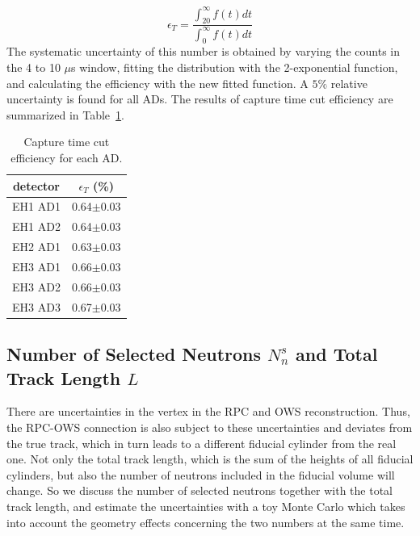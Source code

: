 \begin{equation}
	\epsilon_T=\frac{\int_{20}^{\infty}f(t)dt}{\int_{0}^{\infty}f(t)dt}
\end{equation}
The systematic uncertainty of this number is obtained by varying the counts in the 4 to 10 $\mu$s window, fitting the distribution with the 2-exponential function, and calculating the efficiency with the new fitted function. A $5\%$ relative uncertainty is found for all ADs. The results of capture time cut efficiency are summarized in Table~\ref{tab:timing_efficiency}.
\begin{table}[ht]
	\centering
	\begin{tabular}{|c|c|}
		\hline
		detector & $\epsilon_T$ (\%) \\
		\hline
		EH1 AD1 & 0.64$\pm$0.03 \\
		\hline
		EH1 AD2 & 0.64$\pm$0.03 \\
		\hline
		EH2 AD1 & 0.63$\pm$0.03 \\
		\hline
		EH3 AD1 & 0.66$\pm$0.03 \\
		\hline
		EH3 AD2 & 0.66$\pm$0.03 \\
		\hline
		EH3 AD3 & 0.67$\pm$0.03 \\
		\hline
	\end{tabular}
	\caption{Capture time cut efficiency for each AD.}
	\label{tab:timing_efficiency}
\end{table}


\subsection{Number of Selected Neutrons \texorpdfstring{$N_n^s$}{N} and Total Track Length \texorpdfstring{$L$}{L}}
There are uncertainties in the vertex in the RPC and OWS reconstruction. Thus, the RPC-OWS connection is also subject to these uncertainties and deviates from the true track, which in turn leads to a different fiducial cylinder from the real one. Not only the total track length, which is the sum of the heights of all fiducial cylinders, but also the number of neutrons included in the fiducial volume will change. So we discuss the number of selected neutrons together with the total track length, and estimate the uncertainties with a toy Monte Carlo which takes into account the geometry effects concerning the two numbers at the same time.

